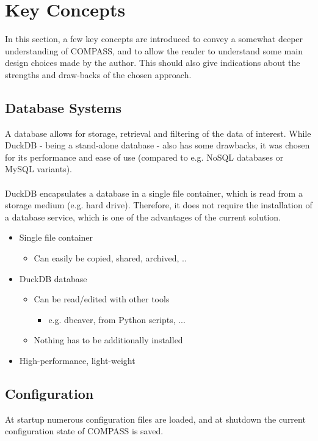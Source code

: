 \section{Key Concepts}
\label{sec:key_concepts}

In this section, a few key concepts are introduced to convey a somewhat deeper understanding of COMPASS, and to allow the reader to understand some main design choices made by the author. 
This should also give indications about the strengths and draw-backs of the chosen approach.

\subsection*{Database Systems}
A database allows for storage, retrieval and filtering of the data of interest. While DuckDB - being a stand-alone database - also has some drawbacks, 
it was chosen for its performance and ease of use (compared to e.g. NoSQL databases or MySQL variants). \\\\
DuckDB encapsulates a database in a single file container, which is read from a storage medium (e.g. hard drive). 
Therefore, it does not require the installation of a database service, which is one of the advantages of the current solution. \\

\begin{itemize}
\item Single file container
\begin{itemize}
\item Can easily be copied, shared, archived, ..
\end{itemize}
\item DuckDB database
\begin{itemize}
\item Can be read/edited with other tools
\begin{itemize}
\item e.g. dbeaver, from Python scripts, ...
\end{itemize}
\item Nothing has to be additionally installed
\end{itemize}
\item High-performance, light-weight
\end{itemize}

\subsection*{Configuration}
At startup numerous configuration files are loaded, and at shutdown the current configuration state of COMPASS is saved.\\\\

